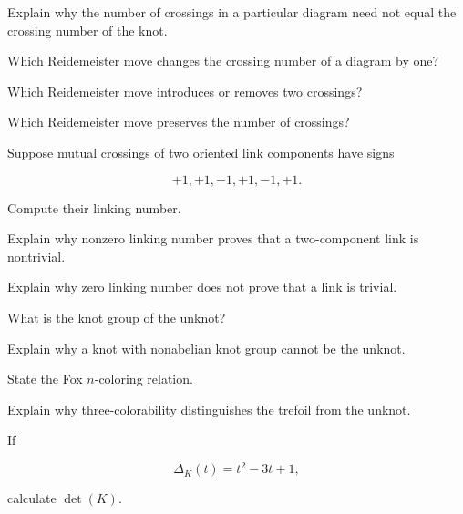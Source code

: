 \begin{exercise}[2]
Explain why the number of crossings in a particular diagram need not equal
the crossing number of the knot.
\end{exercise}

\begin{exercise}[2]
Which Reidemeister move changes the crossing number of a diagram by one?
\end{exercise}

\begin{exercise}[2]
Which Reidemeister move introduces or removes two crossings?
\end{exercise}

\begin{exercise}[2]
Which Reidemeister move preserves the number of crossings?
\end{exercise}

\begin{exercise}[2]
Suppose mutual crossings of two oriented link components have signs

\[
+1,+1,-1,+1,-1,+1.
\]

Compute their linking number.
\end{exercise}

\begin{exercise}[2]
Explain why nonzero linking number proves that a two-component link is
nontrivial.
\end{exercise}

\begin{exercise}[2]
Explain why zero linking number does not prove that a link is trivial.
\end{exercise}

\begin{exercise}[2]
What is the knot group of the unknot?
\end{exercise}

\begin{exercise}[2]
Explain why a knot with nonabelian knot group cannot be the unknot.
\end{exercise}

\begin{exercise}[2]
State the Fox \(n\)-coloring relation.
\end{exercise}

\begin{exercise}[2]
Explain why three-colorability distinguishes the trefoil from the unknot.
\end{exercise}

\begin{exercise}[2]
If

\[
\Delta_K(t)=t^2-3t+1,
\]

calculate \(\det(K)\).
\end{exercise}

